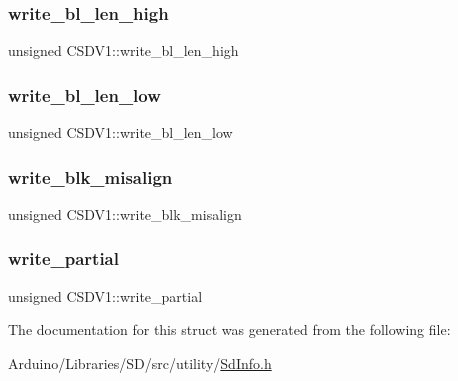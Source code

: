 \subsubsection{\texorpdfstring{write\+\_\+bl\+\_\+len\+\_\+high}{write\_bl\_len\_high}}
{\footnotesize\ttfamily unsigned C\+S\+D\+V1\+::write\+\_\+bl\+\_\+len\+\_\+high}

\mbox{\label{struct_c_s_d_v1_a57c6fb1515a4377af6c642c5d66f7a35}} 
\subsubsection{\texorpdfstring{write\+\_\+bl\+\_\+len\+\_\+low}{write\_bl\_len\_low}}
{\footnotesize\ttfamily unsigned C\+S\+D\+V1\+::write\+\_\+bl\+\_\+len\+\_\+low}

\mbox{\label{struct_c_s_d_v1_a7d2f58a9c9b9447344ce5bdf3a8ffaa3}} 
\subsubsection{\texorpdfstring{write\+\_\+blk\+\_\+misalign}{write\_blk\_misalign}}
{\footnotesize\ttfamily unsigned C\+S\+D\+V1\+::write\+\_\+blk\+\_\+misalign}

\mbox{\label{struct_c_s_d_v1_a24149a92c75ebed1c824e4301e1fad40}} 
\subsubsection{\texorpdfstring{write\+\_\+partial}{write\_partial}}
{\footnotesize\ttfamily unsigned C\+S\+D\+V1\+::write\+\_\+partial}



The documentation for this struct was generated from the following file\+:\begin{DoxyCompactItemize}
\item 
Arduino/\+Libraries/\+S\+D/src/utility/\hyperlink{_sd_info_8h}{Sd\+Info.\+h}\end{DoxyCompactItemize}

